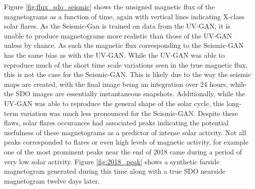 \documentclass[11pt,a4paper,onecolumn]{report}
\begin{document}
Figure \ref{fig:flux_sdo_seismic} shows the unsigned magnetic flux of the
magnetograms as a function of time, again with vertical lines indicating X-class
solar flares. As the Seismic-Gan is trained on data from the UV-GAN, it is unable
to produce magnetograms more realistic than those of the UV-GAN unless by
chance. As such the magnetic flux corresponding to the Seismic-GAN has the same
bias as with the UV-GAN. While the UV-GAN was able to reproduce much of the
short time scale variations seen in the true magnetic flux, this is not the case
for the Seismic-GAN. This is likely due to the way the seismic maps are created,
with the final image being an integration over 24 hours, while the SDO images
are essentially instantaneous snapshots. Additionally, while the UV-GAN was able to
reproduce the general shape of the solar cycle, this long-term variation was
much less pronounced for the Seismic-GAN. Despite these flaws, solar flares
occurances had associated peaks indicating the potential usefulness of these
magnetograms as a predictor of intense solar activity. Not all peaks
corresponded to flares or even high levels of magnetic activity, for example one
of the most prominent peaks near the end of 2018 came during a period of very
low solar activity. Figure \ref{fig:2018_peak} shows a synthetic farside
magnetogram generated during this time along with a true SDO nearside
magnetogram twelve days later.
\end{document}
